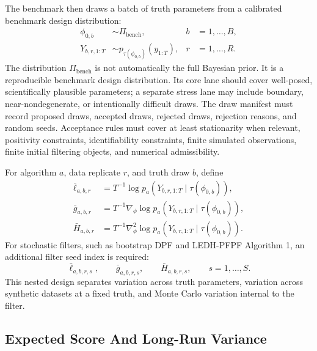 \documentclass[11pt]{article}
\numberwithin{equation}{section}
\begin{document}
The benchmark then draws a batch of truth parameters from a calibrated
benchmark design distribution:
\begin{align}
  \phi_{0,b}&\sim \Pi_{\mathrm{bench}},
  &b&=1,\ldots,B,
  \label{eq:p40-truth-draws}\\
  Y_{b,r,1:T}&\sim p_{\tau(\phi_{0,b})}(y_{1:T}),
  &r&=1,\ldots,R.
  \label{eq:p40-data-draws}
\end{align}
The distribution \(\Pi_{\mathrm{bench}}\) is not automatically the full
Bayesian prior.  It is a reproducible benchmark design distribution.  Its core
lane should cover well-posed, scientifically plausible parameters; a separate
stress lane may include boundary, near-nondegenerate, or intentionally difficult
draws.  The draw manifest must record proposed draws, accepted draws, rejected
draws, rejection reasons, and random seeds.  Acceptance rules must cover at
least stationarity when relevant, positivity constraints, identifiability
constraints, finite simulated observations, finite initial filtering objects,
and numerical admissibility.

For algorithm \(a\), data replicate \(r\), and truth draw \(b\), define
\begin{align}
  \bar\ell_{a,b,r}
  &=
  T^{-1}\log p_a(Y_{b,r,1:T}\mid \tau(\phi_{0,b})),
  \label{eq:p40-average-loglik}\\
  \bar g_{a,b,r}
  &=
  T^{-1}
  \nabla_\phi
  \log p_a(Y_{b,r,1:T}\mid \tau(\phi_{0,b})),
  \label{eq:p40-average-score}\\
  \bar H_{a,b,r}
  &=
  T^{-1}
  \nabla_\phi^2
  \log p_a(Y_{b,r,1:T}\mid \tau(\phi_{0,b})).
  \label{eq:p40-average-hessian}
\end{align}
For stochastic filters, such as bootstrap DPF and LEDH-PFPF Algorithm 1, an
additional filter seed index is required:
\begin{equation}
  \bar\ell_{a,b,r,s},\qquad
  \bar g_{a,b,r,s},\qquad
  \bar H_{a,b,r,s},
  \qquad s=1,\ldots,S.
  \label{eq:p40-stochastic-filter-replicates}
\end{equation}
This nested design separates variation across truth parameters, variation
across synthetic datasets at a fixed truth, and Monte Carlo variation internal
to the filter.

\subsection{Expected Score And Long-Run Variance}
\label{subsec:p40-score-asymptotics}
\end{document}
